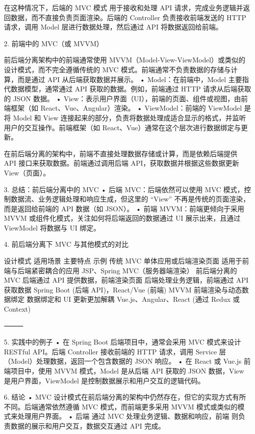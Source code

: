 \documentclass{xduugthesis}
\begin{document}
在这种情况下，后端的 MVC 模式 用于接收和处理 API 请求，完成业务逻辑并返回数据，而不直接负责页面渲染。后端的 Controller 负责接收前端发送的 HTTP 请求，调用 Model 层进行数据处理，然后通过 API 将数据返回给前端。

2. 前端中的 MVC（或 MVVM）

前后端分离架构中的前端通常使用 MVVM（Model-View-ViewModel）或类似的设计模式，而不完全遵循传统的 MVC 模式。前端通常不负责数据的存储与计算，而是通过 API 从后端获取数据并展示。
	•	Model：在前端中，Model 主要指代数据模型，通常通过 API 获取的数据。例如，前端通过 HTTP 请求从后端获取的 JSON 数据。
	•	View：表示用户界面（UI），前端的页面、组件或视图，由前端框架（如 React、Vue、Angular）渲染。
	•	ViewModel：前端的 ViewModel 是将 Model 和 View 连接起来的部分，负责将数据处理成适合显示的格式，并监听用户的交互操作。前端框架（如 React、Vue）通常在这个层次进行数据绑定与更新。

在前后端分离的架构中，前端不直接处理数据存储或计算，而是依赖后端提供 API 接口来获取数据。前端通过调用后端 API，获取数据并根据这些数据更新 View（页面）。

3. 总结：前后端分离中的 MVC
	•	后端 MVC：后端依然可以使用 MVC 模式，控制数据流、业务逻辑处理和响应生成，但这里的 “View” 不再是传统的页面渲染，而是返回给前端的 API 数据（如 JSON）。
	•	前端 MVVM：前端更倾向于采用 MVVM 或组件化模式，关注如何将后端返回的数据通过 UI 展示出来，且通过 ViewModel 将数据与 UI 绑定。

4. 前后端分离下 MVC 与其他模式的对比

设计模式	适用场景	主要特点	示例
传统 MVC	单体应用或后端渲染页面	适用于前端与后端紧密耦合的应用	JSP、Spring MVC（服务器端渲染）
前后端分离的 MVC	后端通过 API 提供数据，前端渲染页面	后端处理业务逻辑，前端通过 API 获取数据	Spring Boot (后端 API)，React/Vue (前端)
MVVM	前端渲染与动态数据绑定	数据绑定和 UI 更新更加解耦	Vue.js、Angular、React (通过 Redux 或 Context)



⸻

5. 实践中的例子
	•	在 Spring Boot 后端项目中，通常会采用 MVC 模式来设计 RESTful API。后端 Controller 接收前端的 HTTP 请求，调用 Service 层（Model）处理数据，返回一个包含数据的 JSON 响应。
	•	在 React 或 Vue.js 前端项目中，使用 MVVM 模式，Model 是从后端 API 获取的 JSON 数据，View 是用户界面，ViewModel 是控制数据展示和用户交互的逻辑代码。

6. 结论
	•	MVC 设计模式在前后端分离的架构中仍然存在，但它的实现方式有所不同。后端通常依然遵循 MVC 模式，而前端更多采用 MVVM 模式或类似的模式来处理用户界面。
	•	后端 通过 MVC 处理业务逻辑、数据和响应，前端 则负责数据的展示和用户交互，数据交互通过 API 完成。
\end{document}
